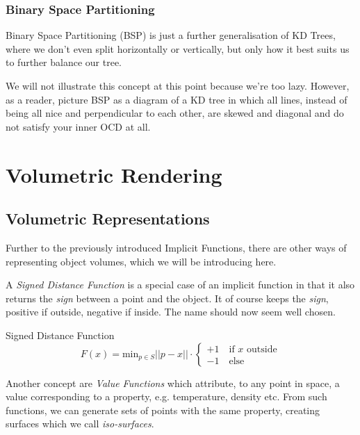 \documentclass{panikzettel}
\begin{document}
\subsubsection*{Binary Space Partitioning}

Binary Space Partitioning (BSP) is just a further generalisation of KD Trees, where we don't even split horizontally or vertically, but only how it best suits us to further balance our tree.

We will not illustrate this concept at this point because we're too lazy. However, as a reader, picture BSP as a diagram of a KD tree in which all lines, instead of being all nice and perpendicular to each other, are skewed and diagonal and do not satisfy your inner OCD at all.

\section{Volumetric Rendering}

\subsection{Volumetric Representations}

Further to the previously introduced Implicit Functions, there are other ways of representing object volumes, which we will be introducing here.

\begin{halfboxl}
A \emph{Signed Distance Function} is a special case of an implicit function in that it also returns the \emph{sign} between a point and the object. It of course keeps the \emph{sign}, positive if outside, negative if inside. The name should now seem well chosen.
\end{halfboxl}%
\begin{halfboxr}
\vspace{-\baselineskip}
\begin{defi}{Signed Distance Function}
\[F(x) = \text{min}_{p \in S} ||p - x|| \cdot \begin{cases} +1 \quad \text{if } x \text{ outside} \\ -1 \quad \text{else} \end{cases}\]
\end{defi}
\end{halfboxr}

Another concept are \emph{Value Functions} which attribute, to any point in space, a value corresponding to a property, e.g. temperature, density etc. From such functions, we can generate sets of points with the same property, creating surfaces which we call \emph{iso-surfaces}.
\end{document}
